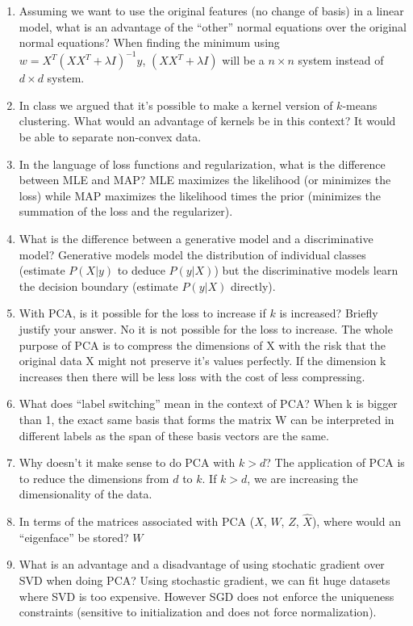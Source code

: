 \documentclass{article}
\def\red#1{{\color{red}#1}}
\def\enum#1{\begin{enumerate}#1\end{enumerate}}
\begin{document}
\enum{
\item Assuming we want to use the original features (no change of basis) in a linear model, what is an advantage of the ``other'' normal equations over the original normal equations? \red{When finding the minimum using $w = X^T(XX^T + \lambda I)^{-1}y$, $(XX^T + \lambda I)$ will be a $n \times n$ system instead of $d \times d$ system.}
\item In class we argued that it's possible to make a kernel version of $k$-means clustering. What would an advantage of kernels be in this context? \red{It would be able to separate non-convex data.}
\item In the language of loss functions and regularization, what is the difference between MLE and MAP?
\red{MLE maximizes the likelihood (or minimizes the loss) while MAP maximizes the likelihood times the prior (minimizes the summation of the loss and the regularizer). }
\item What is the difference between a generative model and a discriminative model? \red{Generative models model the distribution of individual classes (estimate $P(X|y)$ to deduce $P(y|X)$) but the discriminative models learn the decision boundary (estimate $P(y|X)$ directly).}
\item With PCA, is it possible for the loss to increase if $k$ is increased? Briefly justify your answer.
\red{No it is not possible for the loss to increase. The whole purpose of PCA is to compress the dimensions of X with the risk that the original data X might not preserve it's values perfectly. If the dimension k increases then there will be less loss with the cost of less compressing.}
\item What does ``label switching'' mean in the context of PCA? \red{When k is bigger than 1, the exact same basis that forms the matrix W can be interpreted in different labels as the span of these basis vectors are the same.}
\item Why doesn't it make sense to do PCA with $k > d$? \red{The application of PCA is to reduce the dimensions from $d$ to $k$. If $k > d$, we are increasing the dimensionality of the data. }
\item In terms of the matrices associated with PCA ($X$, $W$, $Z$, $\hat{X}$), where would an ``eigenface'' be stored? \red{$W$}
\item What is an advantage and a disadvantage of using stochatic gradient over SVD when doing PCA? \red{Using stochastic gradient, we can fit huge datasets where SVD is too expensive. However SGD does not enforce the uniqueness constraints (sensitive to initialization and does not force normalization).}
}
\end{document}
